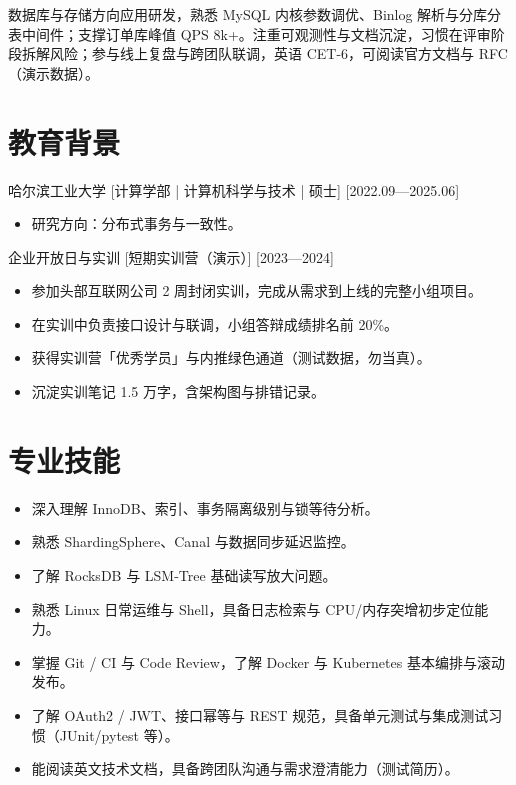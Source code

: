 \documentclass{resume-photo}
\begin{document}

\ResumeTitle

\noindent 数据库与存储方向应用研发，熟悉 MySQL 内核参数调优、Binlog 解析与分库分表中间件；支撑订单库峰值 QPS 8k+。注重可观测性与文档沉淀，习惯在评审阶段拆解风险；参与线上复盘与跨团队联调，英语 CET-6，可阅读官方文档与 RFC（演示数据）。

\section{教育背景}
\ResumeItem
{哈尔滨工业大学}
[\textnormal{计算学部 | 计算机科学与技术 | 硕士}]
[2022.09—2025.06]

\begin{itemize}
  \item 研究方向：分布式事务与一致性。
\end{itemize}


\ResumeItem
{企业开放日与实训}
[\textnormal{短期实训营（演示）}]
[2023—2024]

\begin{itemize}
  \item 参加头部互联网公司 2 周封闭实训，完成从需求到上线的完整小组项目。
  \item 在实训中负责接口设计与联调，小组答辩成绩排名前 20\%。
  \item 获得实训营「优秀学员」与内推绿色通道（测试数据，勿当真）。
  \item 沉淀实训笔记 1.5 万字，含架构图与排错记录。
\end{itemize}



\section{专业技能}
\begin{itemize}
  \item 深入理解 InnoDB、索引、事务隔离级别与锁等待分析。
  \item 熟悉 ShardingSphere、Canal 与数据同步延迟监控。
  \item 了解 RocksDB 与 LSM-Tree 基础读写放大问题。
  \item 熟悉 Linux 日常运维与 Shell，具备日志检索与 CPU/内存突增初步定位能力。
  \item 掌握 Git / CI 与 Code Review，了解 Docker 与 Kubernetes 基本编排与滚动发布。
  \item 了解 OAuth2 / JWT、接口幂等与 REST 规范，具备单元测试与集成测试习惯（JUnit/pytest 等）。
  \item 能阅读英文技术文档，具备跨团队沟通与需求澄清能力（测试简历）。
\end{itemize}
\end{document}
